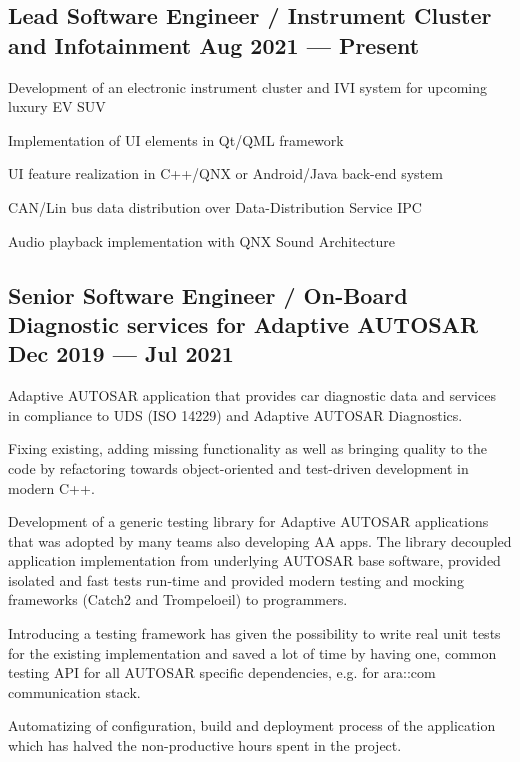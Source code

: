 \documentclass[letter,10pt]{article}
\begin{document}
\subsection{{Lead Software Engineer / Instrument Cluster and Infotainment \hfill Aug 2021 --- Present}}
\begin{zitemize}
\item Development of an electronic instrument cluster and IVI system for upcoming luxury EV SUV
\item Implementation of UI elements in Qt/QML framework
\item UI feature realization in C++/QNX or Android/Java back-end system
\item CAN/Lin bus data distribution over Data-Distribution Service IPC
\item Audio playback implementation with QNX Sound Architecture
\end{zitemize}

\subsection{{Senior Software Engineer / On-Board Diagnostic services for Adaptive AUTOSAR \hfill Dec 2019 --- Jul 2021}}
\begin{zitemize}
\item Adaptive AUTOSAR application that provides car diagnostic data and services in compliance to UDS (ISO 14229) and Adaptive AUTOSAR Diagnostics.
\item Fixing existing, adding missing functionality as well as bringing quality to the code by refactoring towards object-oriented and test-driven development in modern C++.
\item Development of a generic testing library for Adaptive AUTOSAR applications that was adopted by many teams also developing AA apps. The library decoupled application implementation from underlying AUTOSAR base software, provided isolated and fast tests run-time and provided modern testing and mocking frameworks (Catch2 and Trompeloeil) to programmers.
\item Introducing a testing framework has given the possibility to write real unit tests for the existing implementation and saved a lot of time by having one, common testing API for all AUTOSAR specific dependencies, e.g. for ara::com communication stack.
\item Automatizing of configuration, build and deployment process of the application which has halved the non-productive hours spent in the project.
\end{zitemize}
\end{document}
